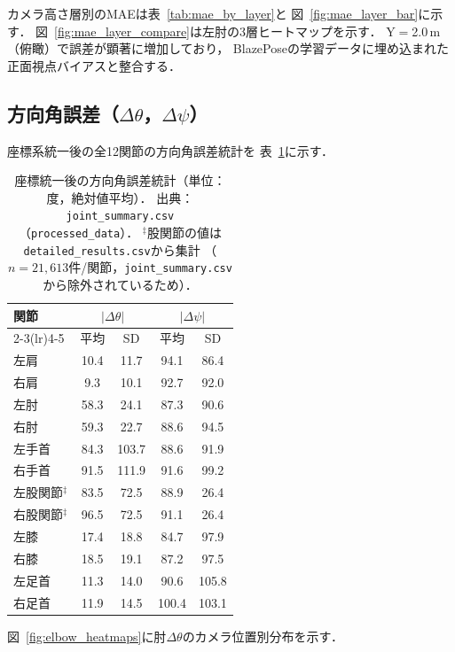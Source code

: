 \documentclass[fleqn]{ieej}
\begin{document}
カメラ高さ層別のMAEは表~\ref{tab:mae_by_layer}と
図~\ref{fig:mae_layer_bar}に示す．
図~\ref{fig:mae_layer_compare}は左肘の3層ヒートマップを示す．
Y$=$2.0\,m（俯瞰）で誤差が顕著に増加しており，
BlazePoseの学習データに埋め込まれた正面視点バイアスと整合する．

\subsection{方向角誤差（$\Delta\theta$，$\Delta\psi$）}

座標系統一後の全12関節の方向角誤差統計を
表~\ref{tab:direction_angle_error}に示す．

\begin{table}[!t]
\centering
\caption{座標統一後の方向角誤差統計（単位：度，絶対値平均）．
  出典：\texttt{joint\_summary.csv}（\texttt{processed\_data}）．
  $^\ddagger$股関節の値は\texttt{detailed\_results.csv}から集計
  （$n=21{,}613$件/関節，\texttt{joint\_summary.csv}から除外されているため）．}
\label{tab:direction_angle_error}
\small
\begin{tabular}{lcccc}
\toprule
関節 & \multicolumn{2}{c}{$|\Delta\theta|$} & \multicolumn{2}{c}{$|\Delta\psi|$} \\
\cmidrule(lr){2-3}\cmidrule(lr){4-5}
     & 平均 & SD & 平均 & SD \\
\midrule
左肩   & 10.4 & 11.7 & 94.1 & 86.4 \\
右肩   &  9.3 & 10.1 & 92.7 & 92.0 \\
左肘   & 58.3 & 24.1 & 87.3 & 90.6 \\
右肘   & 59.3 & 22.7 & 88.6 & 94.5 \\
左手首 & 84.3 & 103.7 & 88.6 & 91.9 \\
右手首 & 91.5 & 111.9 & 91.6 & 99.2 \\
左股関節$^\ddagger$ & 83.5 & 72.5 & 88.9 & 26.4 \\
右股関節$^\ddagger$ & 96.5 & 72.5 & 91.1 & 26.4 \\
左膝   & 17.4 & 18.8 & 84.7 & 97.9 \\
右膝   & 18.5 & 19.1 & 87.2 & 97.5 \\
左足首 & 11.3 & 14.0 & 90.6 & 105.8 \\
右足首 & 11.9 & 14.5 & 100.4 & 103.1 \\
\bottomrule
\end{tabular}
\end{table}

図~\ref{fig:elbow_heatmaps}に肘$\Delta\theta$のカメラ位置別分布を示す．
\end{document}
